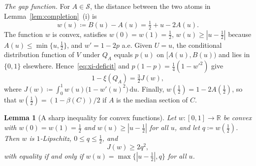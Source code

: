 \documentclass[twocolumn,a4paper]{article}
\numberwithin{equation}{section}
\newtheorem{lemma}[theorem]{Lemma}
\theoremstyle{remark}
\newcommand{\R}{\mathbb{R}}
\newcommand{\1}{\mathbf{1}}
\newcommand{\de}{\,\mathrm{d}}
\begin{document}
\emph{The gap function.}
For \(A\in\mathcal S\), the distance between the two atoms in Lemma~\ref{lem:completion}~(i) is
\begin{equation}\label{eq:gap}
w(u)\coloneqq B(u)-A(u)=\tfrac12+u-2A(u).
\end{equation}
The function \(w\) is convex, satisfies \(w(0)=w(1)=\tfrac12\), \(w(u)\ge|u-\tfrac12|\) because \(A(u)\le\min\{u,\tfrac12\}\), and \(w'=1-2p\) a.e.
Given \(U=u\), the conditional distribution function of \(V\) under \(Q_A\) equals \(p(u)\) on \([A(u),B(u))\) and lies in \(\{0,1\}\) elsewhere.
Hence~\eqref{eq:xi-deficit} and \(p(1-p)=\tfrac14(1-w'^2)\) give
\begin{equation}\label{eq:J}
1-\xi(Q_A)=\tfrac32J(w),
\end{equation}
where \(J(w)\coloneqq\int_0^1w(u)\bigl(1-w'(u)^2\bigr)\de u\).
Finally, \(w(\tfrac12)=1-2A(\tfrac12)\), so that \(w(\tfrac12)=(1-\beta(C))/2\) if \(A\) is the median section of \(C\).

\begin{lemma}[A sharp inequality for convex functions]\label{lem:convex}
Let \(w\colon[0,1]\to\R\) be convex with \(w(0)=w(1)=\tfrac12\) and \(w(u)\ge|u-\tfrac12|\) for all \(u\), and let \(q\coloneqq w(\tfrac12)\).
Then \(w\) is \(1\)-Lipschitz, \(0\le q\le\tfrac12\), and
\[
J(w)\ge2q^2,
\]
with equality if and only if \(w(u)=\max\{|u-\tfrac12|,q\}\) for all \(u\).
\end{lemma}
\end{document}
